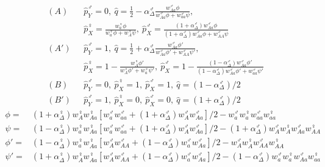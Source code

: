 \documentclass[12pt]{article}
\begin{document}
\begin{subequations}\label{eq:tightequil}
\begin{align}
(A)\ \ \ &\hat{p}_{Y}^{\male}=0,
\ \hat{q}=\frac{1}{2} - \alpha_\Delta^\male \frac{ w_{Aa}^{\male} \phi}{w_{Aa}^{\male} \phi+ w_{aa}^{\male} \psi},\\
&\hat{p}_{X}^{\female}=\frac{w_{a}^{\female} \phi}{w_{a}^{\female} \phi+ w_{A}^{\female} \psi},
\ \hat{p}_{X}^{\male}=\frac{(1+\alpha_\Delta^\male)w_{Aa}^{\male} \phi}{(1+\alpha_\Delta^\male)w_{Aa}^{\male} \phi +w_{AA}^{\male} \psi} \nonumber \\
(A')\ \ \ &\hat{p}_{Y}^{\male}=1,
\ \hat{q}=\frac{1}{2} + \alpha_\Delta^\male \frac{w_{Aa}^{\male} \phi'}{w_{Aa}^{\male} \phi' + w_{AA}^{\male} \psi'},\\
&\hat{p}_{X}^{\female}=1-\frac{w_{A}^{\female} \phi'}{w_{A}^{\female} \phi'+ w_{a}^{\female} \psi'},
\ \hat{p}_{X}^{\male}=1-\frac{(1-\alpha_\Delta^\male)w_{Aa}^{\male} \phi'}{(1-\alpha_\Delta^\male)w_{Aa}^{\male} \phi'+w_{aa}^{\male} \psi'} \nonumber \\
(B)\ \ \ &\hat{p}_{Y}^{\male}=0,\ \hat{p}_{X}^{\female}=1,\ \hat{p}_{X}^{\male}=1, \ \hat{q}=(1 -\alpha^\male_\Delta)/2\\
(B')\ \ \ &\hat{p}_{Y}^{\male}=1,\ \hat{p}_{X}^{\female}=0,\ \hat{p}_{X}^{\male}=0, \ \hat{q}=(1+\alpha^\male_\Delta)/2
\end{align}
\end{subequations}
\begin{equation*}
\begin{split}
\phi=&(1+\alpha^\female_\Delta) w_{A}^{\female} w_{Aa}^{\female} \left[ w_{a}^{\male} w_{aa}^{\male} + (1+\alpha_\Delta^\male) w_{A}^{\male} w_{Aa}^{\male} \right]/2 - w_{a}^{\male} w_{a}^{\female} w_{aa}^{\male} w_{aa}^{\female} \\
\psi=&(1-\alpha^\female_\Delta) w_{a}^{\female} w_{Aa}^{\female} \left[ w_{a}^{\male} w_{aa}^{\male} + (1+\alpha_\Delta^\male) w_{A}^{\male} w_{Aa}^{\male}\right]/2 - (1+\alpha_\Delta^\male) w_{A}^{\male} w_{A}^{\female} w_{Aa}^{\male} w_{AA}^{\female}\\
\phi'=&(1-\alpha^\female_\Delta) w_{a}^{\female} w_{Aa}^{\female} \left[ w_{A}^{\male} w_{AA}^{\male} + (1-\alpha_\Delta^\male) w_{a}^{\male} w_{Aa}^{\male} \right]/2 - w_{A}^{\male} w_{A}^{\female} w_{AA}^{\male} w_{AA}^{\female}\\
\psi'=&(1+\alpha^\female_\Delta) w_{A}^{\female} w_{Aa}^{\female} \left[ w_{A}^{\male} w_{AA}^{\male} + (1-\alpha_\Delta^\male) w_{a}^{\male} w_{Aa}^{\male} \right]/2 - (1-\alpha_\Delta^\male) w_{a}^{\male} w_{a}^{\female} w_{Aa}^{\male} w_{aa}^{\female}
\end{split}
\end{equation*}
\end{document}

